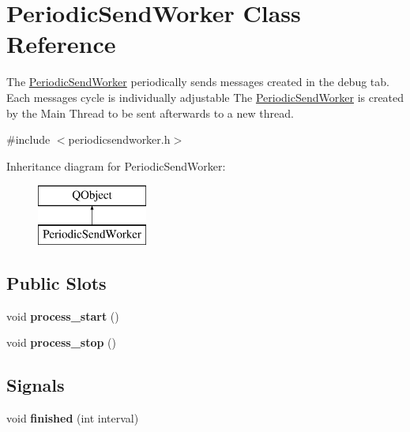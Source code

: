 \hypertarget{class_periodic_send_worker}{}\section{Periodic\+Send\+Worker Class Reference}
\label{class_periodic_send_worker}


The \hyperlink{class_periodic_send_worker}{Periodic\+Send\+Worker} periodically sends messages created in the debug tab. Each message\textquotesingle{}s cycle is individually adjustable The \hyperlink{class_periodic_send_worker}{Periodic\+Send\+Worker} is created by the Main Thread to be sent afterwards to a new thread.  




{\ttfamily \#include $<$periodicsendworker.\+h$>$}

Inheritance diagram for Periodic\+Send\+Worker\+:\begin{figure}[H]
\begin{center}
\leavevmode
\includegraphics[height=2.000000cm]{class_periodic_send_worker}
\end{center}
\end{figure}
\subsection*{Public Slots}
\begin{DoxyCompactItemize}
\item 
\hypertarget{class_periodic_send_worker_af7d2bf362364fa72ce0321b09802b41c}{}void {\bfseries process\+\_\+start} ()\label{class_periodic_send_worker_af7d2bf362364fa72ce0321b09802b41c}

\item 
\hypertarget{class_periodic_send_worker_a3a2d60bd42d640b1d697b38334315f04}{}void {\bfseries process\+\_\+stop} ()\label{class_periodic_send_worker_a3a2d60bd42d640b1d697b38334315f04}

\end{DoxyCompactItemize}
\subsection*{Signals}
\begin{DoxyCompactItemize}
\item 
\hypertarget{class_periodic_send_worker_aaaf285a89993e59771d157fe52bf4330}{}void {\bfseries finished} (int interval)\label{class_periodic_send_worker_aaaf285a89993e59771d157fe52bf4330}

\end{DoxyCompactItemize}


